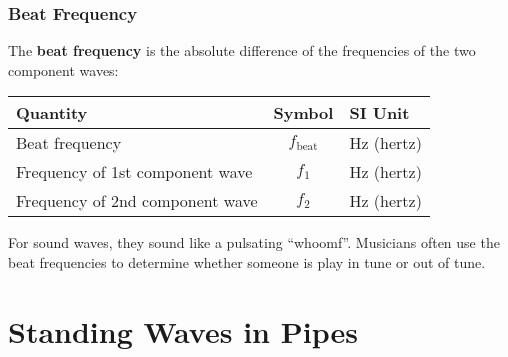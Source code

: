 \documentclass[12pt,aspectratio=169]{beamer}
\newcommand{\eq}[2]{\vspace{#1}{\Large\begin{displaymath}#2\end{displaymath}}}
\begin{document}
\begin{frame}
  \frametitle{Beat Frequency}
  The \textbf{beat frequency} is the absolute difference of the frequencies of
  the two component waves:

  \eq{-.2in}{
    \boxed{f_\mathrm{beat}=|f_1-f_2|}
  }
  \begin{center}
    \begin{tabular}{l|c|l}
      \rowcolor{pink}
      \textbf{Quantity} & \textbf{Symbol} & \textbf{SI Unit} \\ \hline
      Beat frequency     & $f_\mathrm{beat}$   & \si{\hertz} (hertz) \\
      Frequency of 1st component wave & $f_1$ & \si{\hertz} (hertz) \\
      Frequency of 2nd component wave & $f_2$ & \si{\hertz} (hertz)
    \end{tabular}
  \end{center}
  For sound waves, they sound like a pulsating ``whoomf''. Musicians often use
  the beat frequencies to determine whether someone is play in tune or out of
  tune.
\end{frame}



\section[Pipes]{Standing Waves in Pipes}
\end{document}

